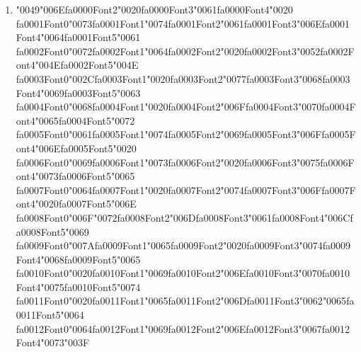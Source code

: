 \documentclass[11pt]{article}
\begin{document}
\begin{enumerate}[label=Q\arabic*., leftmargin=*]
\item {\char"0049}{\char"006E}{\csname fa0000Font2\endcsname\char"0020}{\csname fa0000Font3\endcsname\char"0061}{\csname fa0000Font4\endcsname\char"0020} {\csname fa0001Font0\endcsname\char"0073}{\csname fa0001Font1\endcsname\char"0074}{\csname fa0001Font2\endcsname\char"0061}{\csname fa0001Font3\endcsname\char"006E}{\csname fa0001Font4\endcsname\char"0064}{\csname fa0001Font5\endcsname\char"0061} {\csname fa0002Font0\endcsname\char"0072}{\csname fa0002Font1\endcsname\char"0064}{\csname fa0002Font2\endcsname\char"0020}{\csname fa0002Font3\endcsname\char"0052}{\csname fa0002Font4\endcsname\char"004E}{\csname fa0002Font5\endcsname\char"004E} {\csname fa0003Font0\endcsname\char"002C}{\csname fa0003Font1\endcsname\char"0020}{\csname fa0003Font2\endcsname\char"0077}{\csname fa0003Font3\endcsname\char"0068}{\csname fa0003Font4\endcsname\char"0069}{\csname fa0003Font5\endcsname\char"0063} {\csname fa0004Font0\endcsname\char"0068}{\csname fa0004Font1\endcsname\char"0020}{\csname fa0004Font2\endcsname\char"006F}{\csname fa0004Font3\endcsname\char"0070}{\csname fa0004Font4\endcsname\char"0065}{\csname fa0004Font5\endcsname\char"0072} {\csname fa0005Font0\endcsname\char"0061}{\csname fa0005Font1\endcsname\char"0074}{\csname fa0005Font2\endcsname\char"0069}{\csname fa0005Font3\endcsname\char"006F}{\csname fa0005Font4\endcsname\char"006E}{\csname fa0005Font5\endcsname\char"0020} {\csname fa0006Font0\endcsname\char"0069}{\csname fa0006Font1\endcsname\char"0073}{\csname fa0006Font2\endcsname\char"0020}{\csname fa0006Font3\endcsname\char"0075}{\csname fa0006Font4\endcsname\char"0073}{\csname fa0006Font5\endcsname\char"0065} {\csname fa0007Font0\endcsname\char"0064}{\csname fa0007Font1\endcsname\char"0020}{\csname fa0007Font2\endcsname\char"0074}{\csname fa0007Font3\endcsname\char"006F}{\csname fa0007Font4\endcsname\char"0020}{\csname fa0007Font5\endcsname\char"006E} {\csname fa0008Font0\endcsname\char"006F}{\char"0072}{\csname fa0008Font2\endcsname\char"006D}{\csname fa0008Font3\endcsname\char"0061}{\csname fa0008Font4\endcsname\char"006C}{\csname fa0008Font5\endcsname\char"0069} {\csname fa0009Font0\endcsname\char"007A}{\csname fa0009Font1\endcsname\char"0065}{\csname fa0009Font2\endcsname\char"0020}{\csname fa0009Font3\endcsname\char"0074}{\csname fa0009Font4\endcsname\char"0068}{\csname fa0009Font5\endcsname\char"0065} {\csname fa0010Font0\endcsname\char"0020}{\csname fa0010Font1\endcsname\char"0069}{\csname fa0010Font2\endcsname\char"006E}{\csname fa0010Font3\endcsname\char"0070}{\csname fa0010Font4\endcsname\char"0075}{\csname fa0010Font5\endcsname\char"0074} {\csname fa0011Font0\endcsname\char"0020}{\csname fa0011Font1\endcsname\char"0065}{\csname fa0011Font2\endcsname\char"006D}{\csname fa0011Font3\endcsname\char"0062}{\char"0065}{\csname fa0011Font5\endcsname\char"0064} {\csname fa0012Font0\endcsname\char"0064}{\csname fa0012Font1\endcsname\char"0069}{\csname fa0012Font2\endcsname\char"006E}{\csname fa0012Font3\endcsname\char"0067}{\csname fa0012Font4\endcsname\char"0073}{\char"003F}\\[0.25em]

\end{enumerate}
\end{document}
